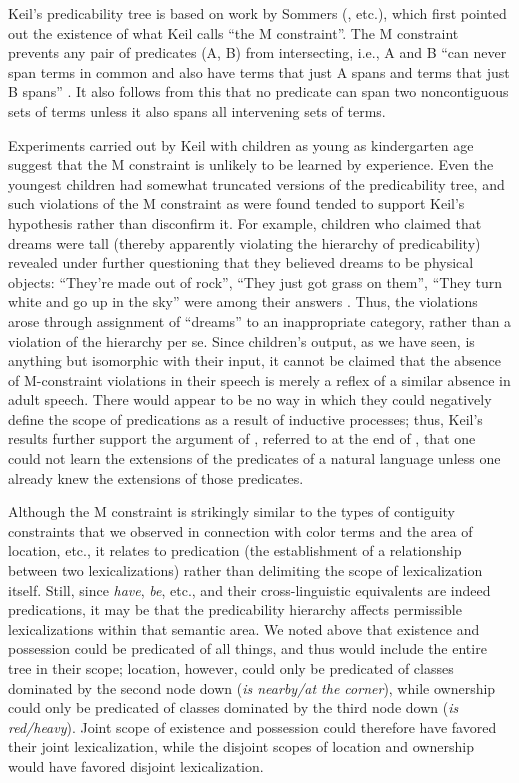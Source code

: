 Keil's predicability tree is based on work by Sommers (\citeyear{Sommers1959,Sommers1963}, etc.), which first pointed out the existence of what Keil calls ``the M constraint''. The M constraint prevents any pair of predicates (A, B) from intersecting, i.e., A and B ``can never span terms in common and also have terms that just A spans and terms that just B spans'' \citep[16]{Keil1979}. It also follows from this that no predicate can span two noncontiguous sets of terms unless it also spans all intervening sets of terms.

Experiments carried out by Keil with children as young as kindergarten age suggest that the M constraint is unlikely to be learned by experience. Even the youngest children had somewhat truncated versions of the predicability tree, and such violations of the M constraint as were found tended to support Keil's hypothesis rather than disconfirm it. For example, children who claimed that dreams were tall (thereby apparently violating the hierarchy of predicability) revealed under further questioning that they believed dreams to be physical objects: ``They're made out of rock'', ``They just got grass on them'', ``They turn white and go up in the sky'' were among their answers \citep[110]{Keil1979}. Thus, the violations arose through assignment of ``dreams'' to an inappropriate category, rather than a violation of the hierarchy per se. Since children's output, as we have seen, is anything but isomorphic with their input, it cannot be claimed that the absence of M-constraint violations in their speech is merely a reflex of a similar absence in adult speech. There would appear to be no way in which they could negatively define the scope of predications as a result of inductive processes; thus, Keil's results further support the argument of \citet{Fodor1975}, referred to at the end of , that one could not learn the extensions of the predicates of a natural language unless one already knew the extensions of those predicates.

Although the M constraint is strikingly similar to the types of contiguity constraints that we observed in connection with color terms and the area of location, etc., it relates to predication (the
establishment of a relationship between two lexicalizations) rather than delimiting the scope of lexicalization itself. Still, since \textit{have}, \textit{be}, etc., and their cross-linguistic equivalents are indeed predications, it may be that the predicability hierarchy affects permissible lexicalizations within that semantic area. We noted above that existence and possession could be predicated of all things, and thus would include the entire tree in their scope; location, however, could only be predicated of classes dominated by the second node down (\textit{is nearby/at the corner}), while ownership could only be predicated of classes dominated by the third node down (\textit{is red/heavy}). Joint scope of existence and possession could therefore have favored their joint lexicalization, while the disjoint scopes of location and ownership would have favored disjoint lexicalization.

